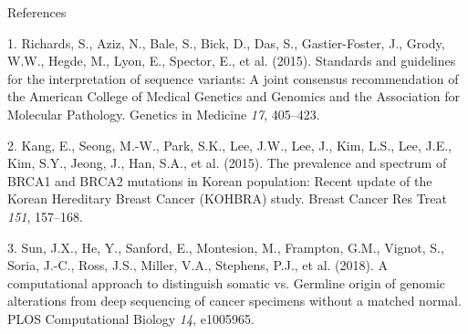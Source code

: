 \documentclass[
  ignorenonframetext,
]{beamer}
\begin{document}
\begin{frame}{References}
\protect\hypertarget{references}{}

\hypertarget{refs}{}
\leavevmode\hypertarget{ref-richards_2015_standards_genetmeda}{}%
1. Richards, S., Aziz, N., Bale, S., Bick, D., Das, S., Gastier-Foster,
J., Grody, W.W., Hegde, M., Lyon, E., Spector, E., et al. (2015).
Standards and guidelines for the interpretation of sequence variants: A
joint consensus recommendation of the American College of Medical
Genetics and Genomics and the Association for Molecular Pathology.
Genetics in Medicine \emph{17}, 405--423.

\leavevmode\hypertarget{ref-kang_2015_prevalence_breastcancerrestreat}{}%
2. Kang, E., Seong, M.-W., Park, S.K., Lee, J.W., Lee, J., Kim, L.S.,
Lee, J.E., Kim, S.Y., Jeong, J., Han, S.A., et al. (2015). The
prevalence and spectrum of BRCA1 and BRCA2 mutations in Korean
population: Recent update of the Korean Hereditary Breast Cancer
(KOHBRA) study. Breast Cancer Res Treat \emph{151}, 157--168.

\leavevmode\hypertarget{ref-sun_2018_computational_ploscomputationalbiology}{}%
3. Sun, J.X., He, Y., Sanford, E., Montesion, M., Frampton, G.M.,
Vignot, S., Soria, J.-C., Ross, J.S., Miller, V.A., Stephens, P.J., et
al. (2018). A computational approach to distinguish somatic vs. Germline
origin of genomic alterations from deep sequencing of cancer specimens
without a matched normal. PLOS Computational Biology \emph{14},
e1005965.

\end{frame}
\end{document}
